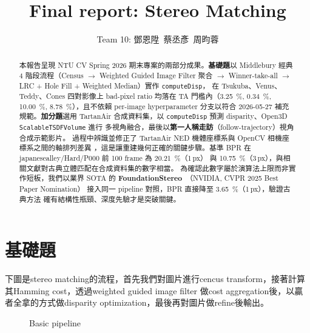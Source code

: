 \documentclass[12pt]{article}
\title{Final report: Stereo Matching}
\author{Team 10: 鄧恩陞\ 蔡丞彥\ 周昀蓉}
\date{}
\begin{document}
\maketitle

\thispagestyle{fancyplain}
\renewcommand{\footrulewidth}{0.4pt}

\begin{abstract}
    本報告呈現 NTU CV Spring 2026 期末專案的兩部分成果。\textbf{基礎題}以
Middlebury 經典 4 階段流程（Census $\to$ Weighted Guided Image Filter 聚合
$\to$ Winner-take-all $\to$ LRC + Hole Fill + Weighted Median）實作 \texttt{computeDisp}，
在 Tsukuba、Venus、Teddy、Cones 四對影像上 bad-pixel ratio 均落在
TA 門檻內（\SI{3.25}{\percent}, \SI{0.34}{\percent}, \SI{10.00}{\percent},
\SI{8.78}{\percent}），且不依賴 per-image hyperparameter 分支以符合
2026-05-27 補充規範。\textbf{加分題}選用 TartanAir 合成資料集，以
\texttt{computeDisp} 預測 disparity、Open3D \texttt{ScalableTSDFVolume} 進行
多視角融合，最後以\textbf{第一人稱走訪}（follow-trajectory）視角合成示範影片。
過程中辨識並修正了 TartanAir NED 機體座標系與 OpenCV 相機座標系之間的軸排列差異
，這是讓重建幾何正確的關鍵步驟。基準 BPR 在
japanesealley/Hard/P000 前 100 frame 為 \SI{20.21}{\percent}（1\,px）
與 \SI{10.75}{\percent}（3\,px），與相關文獻對古典立體匹配在合成資料集的數字相當。
為確認此數字屬於演算法上限而非實作短板，我們以業界 SOTA 的
\textbf{FoundationStereo}~\cite{Wen2025}（NVIDIA, CVPR 2025 Best Paper Nomination）
接入同一 pipeline 對照，BPR 直接降至 \SI{3.65}{\percent}（1\,px），驗證古典方法
確有結構性瓶頸、深度先驗才是突破關鍵。
\end{abstract}

\section{基礎題}
下圖是stereo matching的流程，首先我們對圖片進行cencus transform，接著計算其Hamming cost，透過weighted guided image filter 做cost aggregation後，以贏者全拿的方式做disparity optimization，最後再對圖片做refine後輸出。
\begin{figure}[H]
\begin{center}
\caption{Basic pipeline}
\end{center}
\end{figure}
\end{document}
